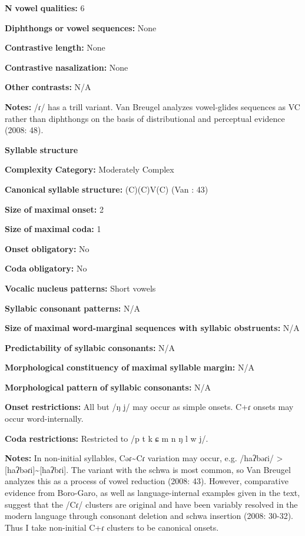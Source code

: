 \textbf{N} \textbf{vowel} \textbf{qualities:} 6

\textbf{Diphthongs} \textbf{or} \textbf{vowel} \textbf{sequences:} None

\textbf{Contrastive} \textbf{length:} None

\textbf{Contrastive} \textbf{nasalization:} None

\textbf{Other} \textbf{contrasts:} N/A

\textbf{Notes:} /ɾ/ has a trill variant. Van Breugel analyzes vowel-glides sequences as VC rather than diphthongs on the basis of distributional and perceptual evidence (2008: 48).

\textbf{Syllable} \textbf{structure}

\textbf{Complexity} \textbf{Category:} Moderately Complex

\textbf{Canonical} \textbf{syllable} \textbf{structure:} (C)(C)V(C) (Van \citealt{Breugel2008}: 43)

\textbf{Size} \textbf{of} \textbf{maximal} \textbf{onset:} 2

\textbf{Size} \textbf{of} \textbf{maximal} \textbf{coda:} 1

\textbf{Onset} \textbf{obligatory:} No

\textbf{Coda} \textbf{obligatory:} No

\textbf{Vocalic} \textbf{nucleus} \textbf{patterns:} Short vowels

\textbf{Syllabic} \textbf{consonant} \textbf{patterns:} N/A

\textbf{Size} \textbf{of} \textbf{maximal} \textbf{word{}-marginal sequences with syllabic obstruents:} N/A

\textbf{Predictability} \textbf{of} \textbf{syllabic} \textbf{consonants:} N/A

\textbf{Morphological} \textbf{constituency} \textbf{of} \textbf{maximal} \textbf{syllable} \textbf{margin:} N/A

\textbf{Morphological} \textbf{pattern} \textbf{of} \textbf{syllabic} \textbf{consonants:} N/A

\textbf{Onset} \textbf{restrictions:} All but /ŋ j/ may occur as simple onsets. C+ɾ onsets may occur word-internally.

\textbf{Coda} \textbf{restrictions:} Restricted to /p t k ɕ m n ŋ l w j/. 

\textbf{Notes:} In non-initial syllables, Cəɾ{\textasciitilde}Cɾ variation may occur, e.g. /haʔbəɾi/ > [haʔbəɾi]{\textasciitilde}[haʔbɾi]. The variant with the schwa is most common, so Van Breugel analyzes this as a process of vowel reduction (2008: 43). However, comparative evidence from Boro-Garo, as well as language-internal examples given in the text, suggest that the /Cɾ/ clusters are original and have been variably resolved in the modern language through consonant deletion and schwa insertion (2008: 30-32). Thus I take non-initial C+ɾ clusters to be canonical onsets.

